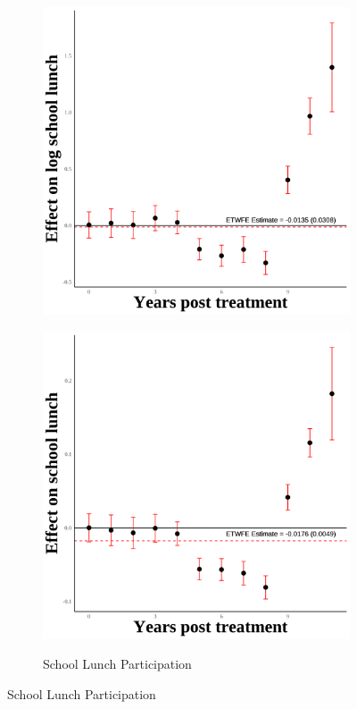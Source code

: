 \documentclass[12pt,english]{article}
\begin{document}
\begin{figure}[H]
\begin{subfigure}[b]{0.3\textwidth}
    \includegraphics[width=\linewidth]{figures/plot42-ln_schl_lunch_event_study-secgen-wh.png}
    \label{fig:ln-schl-lunch-secgen-wh}
  \end{subfigure}
  \hfill
  \begin{subfigure}[b]{0.3\textwidth}
    \centering
    \caption{School Lunch Participation}
    \includegraphics[width=\linewidth]{figures/plot43-schl_lunch_event_study-secgen-wh.png}
    \label{fig:schl-lunch-secgen-wh}
  \end{subfigure}


\end{figure}
\end{document}
